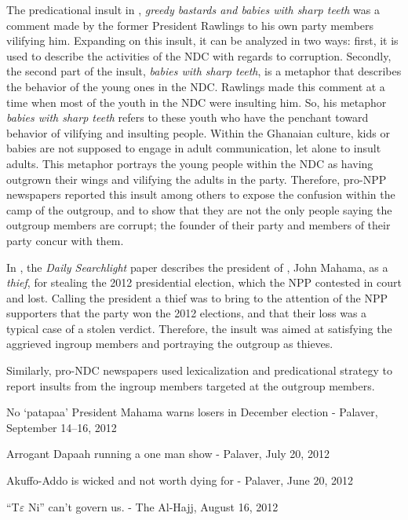 \documentclass[output=paper,modfonts]{langscibook}
\begin{document}
The predicational insult in , \textit{greedy bastards and babies with sharp teeth} was a comment made by the former President Rawlings to his own party members vilifying him. Expanding on this insult, it can be analyzed in two ways: first, it is used to describe the activities of the NDC with regards to corruption. Secondly, the second part of the insult, \textit{babies with sharp teeth}, is a metaphor that describes the behavior of the young ones in the NDC. Rawlings made this comment at a time when most of the youth in the NDC were insulting him. So, his metaphor \textit{babies with sharp teeth} refers to these youth who have the penchant toward behavior of vilifying and insulting people. Within the Ghanaian culture, kids or babies are not supposed to engage in adult communication, let alone to insult adults. This metaphor portrays the young people within the NDC as having outgrown their wings and vilifying the adults in the party. Therefore, pro-NPP newspapers reported this insult among others to expose the confusion within the camp of the outgroup, and to show that they are not the only people saying the outgroup members are corrupt; the founder of their party and members of their party concur with them.

In , the \textit{Daily Searchlight} paper describes the president of , John Mahama, as a \textit{thief}, for stealing the 2012 presidential election, which the NPP contested in court and lost. Calling the president a thief was to bring to the attention of the NPP supporters that the party won the 2012 elections, and that their loss was a typical case of a stolen verdict. Therefore, the insult was aimed at satisfying the aggrieved ingroup members and portraying the outgroup as thieves.

Similarly, pro-NDC newspapers used lexicalization and predicational strategy to report insults from the ingroup members targeted at the outgroup members.

\ea \label{ex:ofori:5}
\textup{No ‘patapaa’ President Mahama warns losers in December election} -  Palaver, September 14--16, 2012\z

\ea \label{ex:ofori:6}
\textup{Arrogant  Dapaah running a one man show} -  Palaver, July 20, 2012\z

\ea \label{ex:ofori:7}
\textup{Akuffo-Addo is wicked and not worth dying for} -  Palaver, June 20, 2012\z

\ea \label{ex:ofori:8}
\textup{“T$\varepsilon $ Ni” can’t govern us.} - The Al-Hajj, August 16, 2012\z
\end{document}

